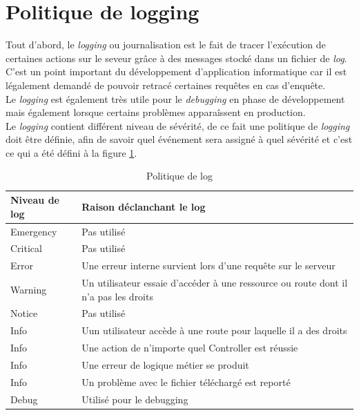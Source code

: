 \documentclass[
    iai, %
    il, %
]{heig-tb}
\begin{document}
\section{Politique de logging}
Tout d'abord, le \emph{logging} ou journalisation est le fait de tracer l'exécution de certaines actions sur le seveur grâce à des messages stocké dans un fichier de \emph{log}. \\
C'est un point important du développement d'application informatique car il est légalement demandé de pouvoir retracé certaines requêtes en cas d'enquête. \\
Le \emph{logging} est également très utile pour le \emph{debugging} en phase de développement mais également lorsque certains problèmes apparaîssent en production. \\
Le \emph{logging} contient différent niveau de sévérité, de ce fait une politique de \emph{logging} doit être définie, afin de savoir quel événement sera assigné à quel sévérité et c'est ce qui a été défini à la figure \ref{politique-log}.

\begin{table}[h]
    \begin{center}
        \caption{Politique de log\label{politique-log}}
        \begin{tabularx}{1.0\textwidth} {l|X}
            Niveau de log & Raison déclanchant le log                                                           \\ \hline
            Emergency     & Pas utilisé                                                                         \\
            Critical      & Pas utilisé                                                                         \\
            Error         & Une erreur interne survient lors d'une requête sur le serveur                       \\
            Warning       & Un utilisateur essaie d'accéder à une ressource ou route dont il n'a pas les droits \\
            Notice        & Pas utilisé                                                                         \\
            Info          & Uun utilisateur accède à une route pour laquelle il a des droits              \\
            Info          & Une action de n'importe quel Controller est réussie                          \\
            Info          & Une erreur de logique métier se produit                                      \\
            Info          & Un problème avec le fichier téléchargé est reporté                               \\
            Debug         & Utilisé pour le debugging                                                           \\
        \end{tabularx}
    \end{center}
\end{table}
\end{document}
